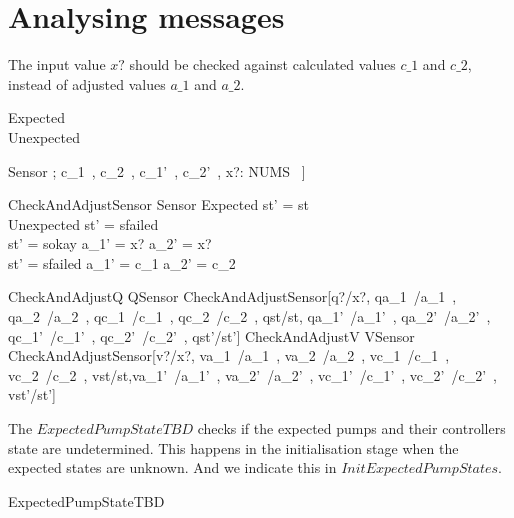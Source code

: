 \documentclass{report} %
\begin{document}
\section{Analysing messages}

The input value $x?$ should be checked against calculated values $c\_1$ and $c\_2$, instead of adjusted values $a\_1$ and $a\_2$.
\begin{zed}
  Expected  \\ %
  Unexpected  \\ %
\end{zed}

\begin{zed}
  Sensor \defs [~ \Delta Unit[SState]; c\_1~, c\_2~, c\_1'~, c\_2'~, x?: NUMS ~]
\end{zed}

\begin{schema}{CheckAndAdjustSensor}
  Sensor
  \where %
  Expected \implies st' = st \\ %
  Unexpected \implies st' = sfailed \\ %
  st' = sokay \implies a\_1' = x? \land a\_2' = x?  \\ %
  st' = sfailed \implies a\_1' = c\_1 \land a\_2' = c\_2
\end{schema}

\begin{zed}
  CheckAndAdjustQ  QSensor \land CheckAndAdjustSensor[q?/x?, qa\_1~/a\_1~, qa\_2~/a\_2~, qc\_1~/c\_1~, qc\_2~/c\_2~, qst/st, qa\_1'~/a\_1'~, qa\_2'~/a\_2'~, qc\_1'~/c\_1'~, qc\_2'~/c\_2'~, qst'/st']
  \also %
  CheckAndAdjustV  VSensor \land CheckAndAdjustSensor[v?/x?, va\_1~/a\_1~, va\_2~/a\_2~, vc\_1~/c\_1~, vc\_2~/c\_2~, vst/st,va\_1'~/a\_1'~, va\_2'~/a\_2'~, vc\_1'~/c\_1'~, vc\_2'~/c\_2'~, vst'/st']
\end{zed}

The $ExpectedPumpStateTBD$ checks if the expected pumps and their controllers state are undetermined. This happens in the initialisation stage when the expected states are unknown. And we indicate this in $InitExpectedPumpStates$.
\begin{zed}
ExpectedPumpStateTBD 
\end{zed}
\end{document}

